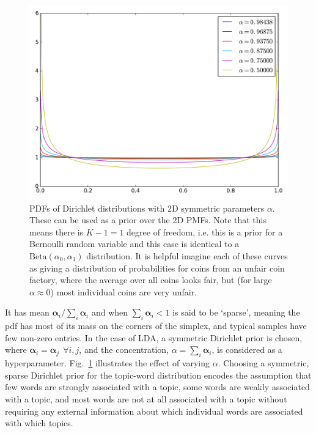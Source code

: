 \begin{figure}
	\centering
	\includegraphics[width=0.65\columnwidth]{figures/beta.png}
	\caption{
		PDFs of Dirichlet distributions with 2D symmetric parameters $\alpha$. These can be used as a prior over the 2D PMFs. Note that this means there is $K-1 = 1$ degree of freedom, i.e. this is a prior for a Bernoulli random variable and this case is identical to a $\mathrm{Beta}(\alpha_0, \alpha_1)$ distribution. It is helpful imagine each of these curves as giving a distribution of probabilities for coins from an unfair coin factory, where the average over all coins looks fair, but (for large $\alpha \approx 0$) most individual coins are very unfair.
	}
	\label{fig:beta-pdf}

\end{figure}

It has mean $\boldsymbol{\alpha}_i / \sum_i \boldsymbol{\alpha}_i$ and when $\sum_i \boldsymbol{\alpha}_i < 1$ is said to be `sparse', meaning the pdf has most of its mass on the corners of the simplex, and typical samples have few non-zero entries. In the case of LDA, a symmetric Dirichlet prior is chosen, where $\boldsymbol{\alpha}_i = \boldsymbol{\alpha}_j ~~\forall i, j$, and the concentration, $\alpha = \sum_i \boldsymbol{\alpha}_i$, is considered as a hyperparameter. Fig.~\ref{fig:beta-pdf} illustrates the effect of varying $\alpha$. Choosing a symmetric, sparse Dirichlet prior for the topic-word distribution encodes the assumption that few words are strongly associated with a topic, some words are weakly associated with a topic, and most words are not at all associated with a topic without requiring any external information about which individual words are associated with which topics.

